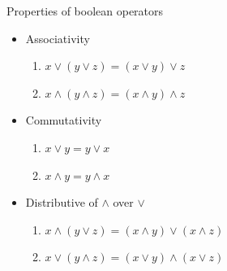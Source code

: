 \documentclass[10pt,xcolor={table,dvipsnames},t]{beamer}
\begin{document}
\begin{frame}{Properties of boolean operators}
  \begin{itemize}
    \item Associativity
    \begin{enumerate}
      \item $x\lor (y\lor z) = (x\lor y) \lor z$
      \item $x\land (y\land z) = (x\land y) \land z$
    \end{enumerate}
    \item Commutativity
    \begin{enumerate}
      \item $x\lor y = y \lor x$
      \item $x\land y  = y\land x$
    \end{enumerate}
    \item Distributive of $\land$ over $\lor$
    \begin{enumerate}
      \item $x \land (y\lor z) = (x \land y) \lor (x \land z)$\\
      \item $x \lor (y\land z) = (x\lor y) \land (x\lor z)$
    \end{enumerate}
  \end{itemize}
\end{frame}
\end{document}
